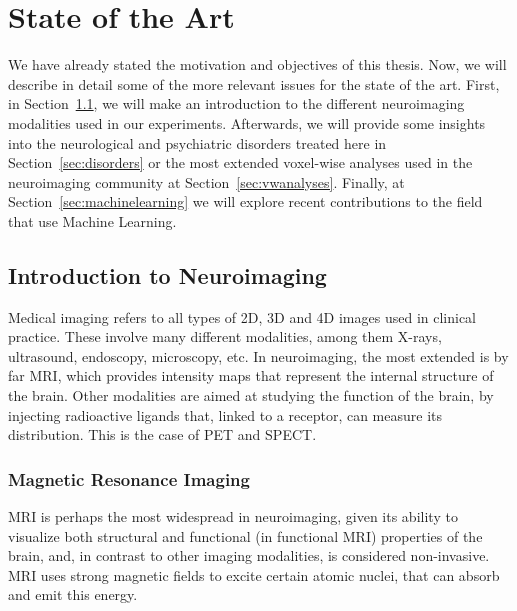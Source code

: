 \chapter{State of the Art}\label{ch:stateofart}
We have already stated the motivation and objectives of this thesis. Now, we will describe in detail some of the more relevant issues for the state of the art. First, in Section~\ref{sec:neuroimaging}, we will make an introduction to the different neuroimaging modalities used in our experiments. Afterwards, we will provide some insights into the neurological and psychiatric disorders treated here in Section~\ref{sec:disorders} or the most extended voxel-wise analyses used in the neuroimaging community at Section~\ref{sec:vwanalyses}. Finally, at Section~\ref{sec:machinelearning} we will explore recent contributions to the field that use Machine Learning. 

\section{Introduction to Neuroimaging}\label{sec:neuroimaging}
Medical imaging refers to all types of 2D, 3D and 4D images used in clinical practice. These involve many different modalities, among them X-rays, ultrasound, endoscopy, microscopy, etc. In neuroimaging, the most extended is by far \ac{MRI}, which provides intensity maps that represent the internal structure of the brain. Other modalities are aimed at studying the function of the brain, by injecting radioactive ligands that, linked to a receptor, can measure its distribution. This is the case of \ac{PET} and \ac{SPECT}.

\subsection{Magnetic Resonance Imaging}
\acf{MRI} is perhaps the most widespread in neuroimaging, given its ability to visualize both structural and functional (in functional \ac{MRI}) properties of the brain, and, in contrast to other imaging modalities, is considered non-invasive. \ac{MRI} uses strong magnetic fields to excite certain atomic nuclei, that can absorb and emit this energy. 

